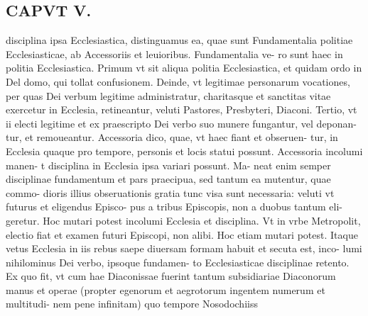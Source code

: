 \documentclass{article}
\begin{document}
\begin{pages}
\section*{CAPVT  V. }
\marginpar{[ p.289 ]}\pstart disciplina ipsa Ecclesiastica, distinguamus ea, quae sunt Fundamentalia politiae Ecclesiasticae, ab Accessoriis et leuioribus. Fundamentalia ve- ro sunt haec in politia Ecclesiastica. Primum vt sit aliqua politia Ecclesiastica, et quidam ordo in Del domo, qui tollat confusionem. Deinde, vt legitimae personarum vocationes, per quas Dei verbum legitime administratur, charitasque et sanctitas vitae exercetur in Ecclesia, retineantur, veluti Pastores, Presbyteri, Diaconi. Tertio, vt ii electi legitime et ex praescripto Dei verbo suo munere fungantur, vel deponan- tur, et remoueantur. Accessoria dico, quae, vt haec fiant et obseruen- tur, in Ecclesia quaque pro tempore, personis et locis statui possunt. Accessoria incolumi manen- t disciplina in Ecclesia ipsa variari possunt. Ma- neat enim semper disciplinae fundamentum et pars praecipua, sed tantum ea mutentur, quae commo- dioris illius obseruationis gratia tunc visa sunt necessaria: veluti vt futurus et eligendus Episco- pus a tribus Episcopis, non a duobus tantum eli- geretur. Hoc mutari potest incolumi Ecclesia et disciplina. Vt in vrbe Metropolit, electio fiat et examen futuri Episcopi, non alibi. Hoc etiam mutari potest. Itaque vetus Ecclesia in iis rebus saepe diuersam formam habuit et secuta est, inco- lumi nihilominus Dei verbo, ipsoque fundamen- to Ecclesiasticae disciplinae retento. Ex quo fit, vt cum hae Diaconissae fuerint tantum subsidiariae Diaconorum manus et operae (propter egenorum et aegrotorum ingentem numerum et multitudi- nem pene infinitam) quo tempore Nosodochiiss  \pend

\end{pages}
\end{document}
